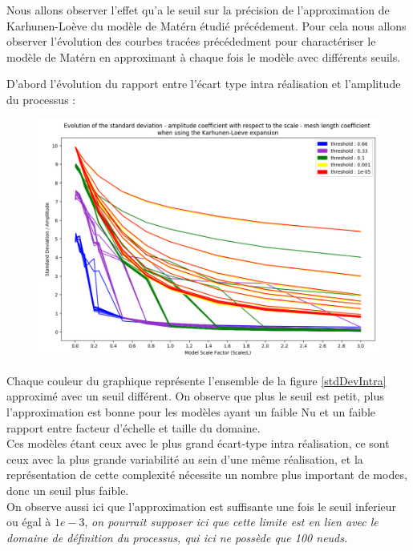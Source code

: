 \documentclass[a4paper,10pt]{article}
\begin{document}
	 Nous allons observer l'effet qu'a le seuil sur la précision de l'approximation de Karhunen-Loève du modèle de Matérn étudié précédement. Pour cela nous allons observer l'évolution des courbes tracées précédedment pour charactériser le modèle de Matérn en approximant à chaque fois le modèle avec différents seuils. 
	 
	 D'abord l'évolution du rapport entre l'écart type intra réalisation et l'amplitude du processus : 
	 
\begin{figure}[H]
   \centering   
   \noindent \includegraphics[width = \linewidth]{stdDevIntraKL.png}
      \caption{}
         \label{stdDevIntraKL}
\end{figure}
	 
	 Chaque couleur du graphique représente l'ensemble de la figure \ref{stdDevIntra} approximé avec un seuil différent. On observe que plus le seuil est petit, plus l'approximation est bonne pour les modèles ayant un faible Nu et un faible rapport entre facteur d'échelle et taille du domaine. \\
	 Ces modèles étant ceux avec le plus grand écart-type intra réalisation, ce sont ceux avec la plus grande variabilité au sein d'une même réalisation, et la représentation de cette complexité nécessite un nombre plus important de modes, donc un seuil plus faible. \\ 
	 On observe aussi ici que l'approximation est suffisante une fois le seuil inferieur ou égal à $1e-3$, \emph{on pourrait supposer ici que cette limite est en lien avec le domaine de définition du processus, qui ici ne possède que 100 neuds.} 

\newpage
	 
\end{document}
